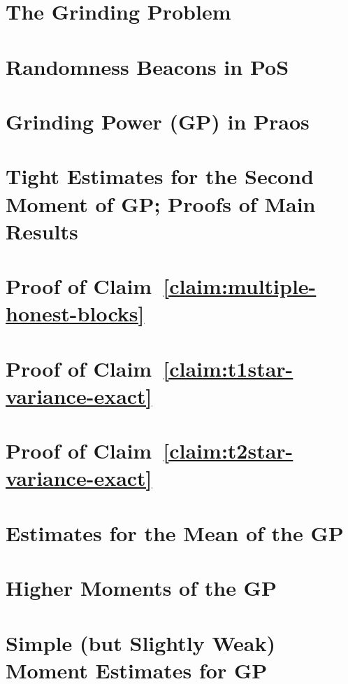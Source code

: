 


\chapter{The Grinding Problem}\label{ch:grinding-intro}


\chapter{Randomness Beacons in PoS}\label{sec:model-grinding}


% 

\chapter{Grinding Power (GP) in Praos}\label{sec:praos}



\chapter{Tight Estimates for the Second Moment of GP; Proofs of Main Results}\label{sec:praos-second-moment}\label{sec:main-theorems}




\chapter{Proof of Claim~\ref{claim:multiple-honest-blocks}}\label{sec:praos-claim-multiple-honest-blocks}



\chapter{Proof of Claim~\ref{claim:t1star-variance-exact}}\label{sec:praos-claim-t1star-variance-exact}



\chapter{Proof of Claim~\ref{claim:t2star-variance-exact}}\label{sec:praos-claim-t2star-variance-exact}



\chapter{Estimates for the Mean of the GP}



\chapter{Higher Moments of the GP}



\chapter{Simple (but Slightly Weak) Moment Estimates for GP}\label{app:grinding-praos}



